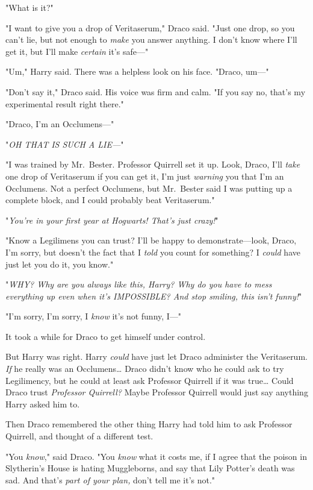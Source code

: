 "What is it?"

"I want to give you a drop of Veritaserum," Draco said. "Just one drop, so you 
can't lie, but not enough to \emph{make} you answer anything. I don't know 
where I'll get it, but I'll make \emph{certain} it's safe---"

"Um," Harry said. There was a helpless look on his face. "Draco, um---"

"Don't say it," Draco said. His voice was firm and calm. "If you say no, that's 
my experimental result right there."

"Draco, I'm an Occlumens---"

"\emph{OH THAT IS SUCH A LIE---}"

"I was trained by Mr.~Bester. Professor Quirrell set it up. Look, Draco, I'll 
\emph{take} one drop of Veritaserum if you can get it, I'm just \emph{warning} 
you that I'm an Occlumens. Not a perfect Occlumens, but Mr.~Bester said I was 
putting up a complete block, and I could probably beat Veritaserum."

"\emph{You're in your first year at Hogwarts! That's just crazy!}"

"Know a Legilimens you can trust? I'll be happy to demonstrate---look, Draco, 
I'm sorry, but doesn't the fact that I \emph{told} you count for something? I 
\emph{could} have just let you do it, you know."

"\emph{WHY? Why are you always like this, Harry? Why do you have to mess 
everything up even when it's IMPOSSIBLE? And stop smiling, this isn't funny!}"

"I'm sorry, I'm sorry, I \emph{know} it's not funny, I---"

It took a while for Draco to get himself under control.

But Harry was right. Harry \emph{could} have just let Draco administer the 
Veritaserum. \emph{If} he really was an Occlumens{\ldots} Draco didn't know who 
he could ask to try Legilimency, but he could at least ask Professor Quirrell 
if it was true{\ldots} Could Draco trust \emph{Professor Quirrell?} Maybe 
Professor Quirrell would just say anything Harry asked him to.

Then Draco remembered the other thing Harry had told him to ask Professor 
Quirrell, and thought of a different test.

"You \emph{know}," said Draco. "You \emph{know} what it costs me, if I agree 
that the poison in Slytherin's House is hating Muggleborns, and say that Lily 
Potter's death was sad. And that's \emph{part of your plan,} don't tell me it's 
not."

